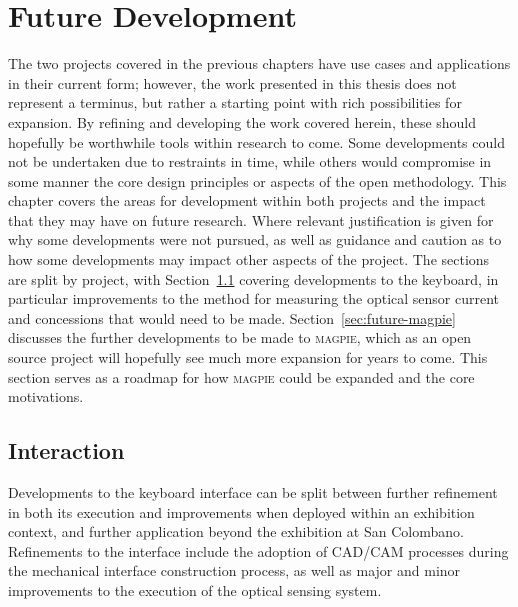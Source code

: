 \chapter{Future Development}\label{ch:future}


The two projects covered in the previous chapters have use cases and applications in their current form; however, the work presented in this thesis does not represent a terminus, but rather a starting point with rich possibilities for expansion. By refining and developing the work covered herein, these should hopefully be worthwhile tools within research to come. Some developments could not be undertaken due to restraints in time, while others would compromise in some manner the core design principles or aspects of the open methodology. This chapter covers the areas for development within both projects and the impact that they may have on future research. Where relevant justification is given for why some developments were not pursued, as well as guidance and caution as to how some developments may impact other aspects of the project. The sections are split by project, with Section~\ref{sec:future-interaction} covering developments to the keyboard, in particular improvements to the method for measuring the optical sensor current and concessions that would need to be made. Section~\ref{sec:future-magpie} discusses the further developments to be made to \textsc{magpie}, which as an open source project will hopefully see much more expansion for years to come. This section serves as a roadmap for how \textsc{magpie} could be expanded and the core motivations.

\section{Interaction}\label{sec:future-interaction}

Developments to the keyboard interface can be split between further refinement in both its execution and improvements when deployed within an exhibition context, and further application beyond the exhibition at San Colombano. Refinements to the interface include the adoption of CAD/CAM processes during the mechanical interface construction process, as well as major and minor improvements to the execution of the optical sensing system.

